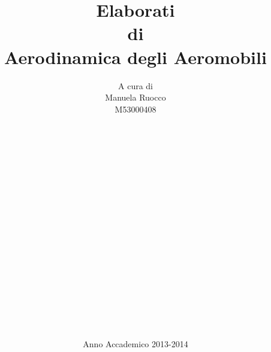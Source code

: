 \documentclass [a4paper,12pt,oneside,openany]{book}
\begin{document}

\author{A cura di \\ \Large Manuela Ruocco\\ \small \rmfamily M53000408\\ \\ \\ \\ \\ \\ \\ \\ \\ \\ \\ \\ \\ \\ \\ \\ \\ \\ \\ \\ Anno Accademico 2013-2014}
\title{Elaborati \\ di \\ Aerodinamica degli Aeromobili}
\date{}  %

\maketitle
\end{document}

